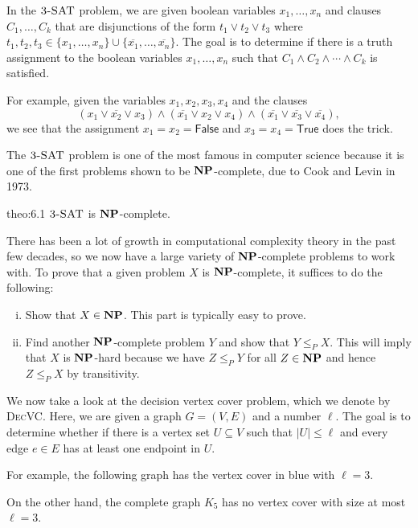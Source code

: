 In the $\textsc{3-SAT}$ problem, we are given boolean variables $x_1, \dots, x_n$ and clauses 
$C_1, \dots, C_k$ that are disjunctions of the form $t_1 \vee t_2 \vee t_3$ 
where $t_1, t_2, t_3 \in \{x_1, \dots, x_n\} \cup \{\overline{x_1}, \dots, \overline{x_n}\}$. 
The goal is to determine if there is a truth assignment to the boolean variables 
$x_1, \dots, x_n$ such that $C_1 \wedge C_2 \wedge \cdots \wedge C_k$ is satisfied. 

For example, given the variables $x_1, x_2, x_3, x_4$ and the clauses 
\[ (x_1 \vee \overline{x_2} \vee x_3) \wedge (\overline{x_1} \vee x_2 \vee x_4) 
\wedge (\overline{x_1} \vee \overline{x_3} \vee \overline{x_4}), \] 
we see that the assignment $x_1 = x_2 = \textsf{False}$ and 
$x_3 = x_4 = \textsf{True}$ does the trick.

The $\textsc{3-SAT}$ problem is one of the most famous in computer science 
because it is one of the first problems shown to be $\mathbf{NP}$-complete, 
due to Cook and Levin in 1973.

\begin{theo}{theo:6.1}
    $\textsc{3-SAT}$ is $\mathbf{NP}$-complete.
\end{theo}

There has been a lot of growth in computational complexity theory in 
the past few decades, so we now have a large variety of $\mathbf{NP}$-complete 
problems to work with. To prove that a given problem $X$ is $\mathbf{NP}$-complete, 
it suffices to do the following: 
\begin{enumerate}[(i)]
    \item Show that $X \in \mathbf{NP}$. This part is typically easy to prove. 
    \item Find another $\mathbf{NP}$-complete problem $Y$ and show that $Y \leq_P X$. 
    This will imply that $X$ is $\mathbf{NP}$-hard because we have $Z \leq_P Y$ for all 
    $Z \in \mathbf{NP}$ and hence $Z \leq_P X$ by transitivity.
\end{enumerate}
We now take a look at the decision vertex cover problem, which we denote by
\textsc{DecVC}. Here, we are given a graph $G = (V, E)$ and a number 
$\ell$. The goal is to determine whether if there is a vertex set $U \subseteq V$ 
such that $|U| \leq \ell$ and every edge $e \in E$ has at least one 
endpoint in $U$.

For example, the following graph has the vertex cover in blue with $\ell = 3$.
\begin{center}
\end{center}\vspace{-0.25cm}
On the other hand, the complete graph $K_5$ has no vertex cover with size 
at most $\ell = 3$. 

